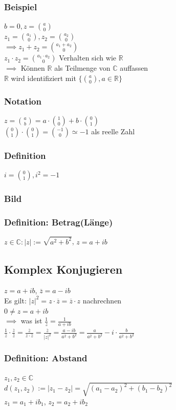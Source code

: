 \documentclass[fleqn]{scrbook}
\begin{document}
\subsubsection{Beispiel}
$b=0,z=\binom{a}{0}$\\$z_1=\binom{a_1}{0},z_2 = \binom{a_2}{0}$\\
$\implies z_1 + z_2 = \binom{a_1+a_2}{0}$\\
$z_1  \cdot  z_2 = \binom{a_1  \cdot  a_2}{0}$ Verhalten sich wie $\mathbb{R}$\\
$\implies$ Können $\mathbb{R}$ als Teilmenge von $\mathbb{C}$ auffassen\\
$\mathbb{R}$ wird identifiziert mit $\{\binom{a}{0}, a \in \mathbb{R}\}$
\subsubsection{Notation}
$z=\binom{a}{b}=a \cdot \binom{1}{0}+b \cdot \binom{0}{1}$\\
$\binom{0}{1}  \cdot  \binom{0}{1} = \binom{-1}{0} \simeq -1$ als reelle Zahl
\subsubsection{Definition} $i = \binom{0}{1}, i^2 = -1$
\subsubsection{Bild}
\subsubsection{Definition: Betrag(Länge)} 
$z \in \mathbb{C}:|z|:=\sqrt{a^2 + b^2}$, $z=a+ib$
\subsection{Komplex Konjugieren} $z = a+ib$, $\overline{z} = a - ib$\\
Es gilt: $|z|^2 = z  \cdot  \overline{z} = \overline{z}  \cdot  z$ nachrechnen\\
$0 \neq z = a + ib$\\
$\implies$ was ist $\frac{1}{z} = \frac{1}{a+ib}$\\
$\frac{1}{z}  \cdot  \frac{\overline{z}}{\overline{z}} = \frac{\overline{z}}{z  \cdot  \overline{z}} = \frac{\overline{z}}{|z|^2} = \frac{a-ib}{a^2 + b^2} = \frac{a}{a^2 + b^2} - i \cdot \frac{b}{a^2 + b^2}$
\subsubsection{Definition: Abstand} $z_1, z_2 \in \mathbb{C}$\\
$d(z_1,z_2) := |z_1 - z_2| = \sqrt{(a_1 - a_2)^2 + (b_1 - b_2)^2}$\\
$z_1 = a_1 + ib_1$, $z_2 = a_2 + ib_2$
\end{document}
